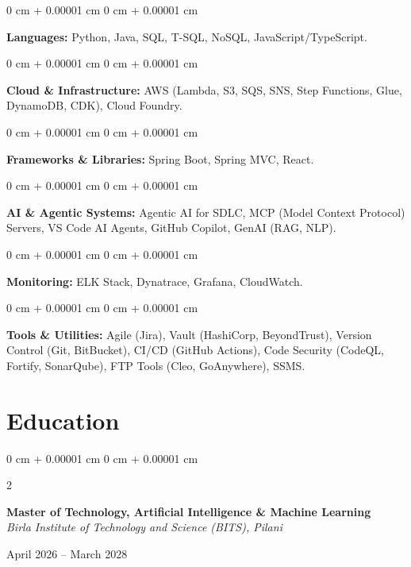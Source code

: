\documentclass[10pt, letterpaper]{article}
\newenvironment{onecolentry}{
    \begin{adjustwidth}{
        0 cm + 0.00001 cm
    }{
        0 cm + 0.00001 cm
    }
}{
    \end{adjustwidth}
} %
\newenvironment{twocolentry}[2][]{
    \onecolentry
    \def\secondColumn{#2}
    \setcolumnwidth{\fill, 4.5 cm}
    \begin{paracol}{2}
}{
    \switchcolumn \raggedleft \secondColumn
    \end{paracol}
    \endonecolentry
} %
\begin{document}
        \begin{onecolentry}
            \textbf{Languages:} Python, Java, SQL, T-SQL, NoSQL, JavaScript/TypeScript.
        \end{onecolentry}
        \vspace{0.2 cm}

        \begin{onecolentry}
            \textbf{Cloud \& Infrastructure:} AWS (Lambda, S3, SQS, SNS, Step Functions, Glue, DynamoDB, CDK), Cloud Foundry.
        \end{onecolentry}
        \vspace{0.2 cm}

        \begin{onecolentry}
            \textbf{Frameworks \& Libraries:} Spring Boot, Spring MVC, React.
        \end{onecolentry}
        \vspace{0.2 cm}

        \begin{onecolentry}
            \textbf{AI \& Agentic Systems:} Agentic AI for SDLC, MCP (Model Context Protocol) Servers, VS Code AI Agents, GitHub Copilot, GenAI (RAG, NLP).
        \end{onecolentry}
        \vspace{0.2 cm}

        \begin{onecolentry}
            \textbf{Monitoring:} ELK Stack, Dynatrace, Grafana, CloudWatch.
        \end{onecolentry}
        \vspace{0.2 cm}

        \begin{onecolentry}
            \textbf{Tools \& Utilities:} Agile (Jira), Vault (HashiCorp, BeyondTrust), Version Control (Git, BitBucket), CI/CD (GitHub Actions), Code Security (CodeQL, Fortify, SonarQube), FTP Tools (Cleo, GoAnywhere), SSMS.
        \end{onecolentry}
        \vspace{0.2 cm}

          \section{Education}



        
       \begin{twocolentry}{April 2026 – March 2028}
            \textbf{Master of Technology, Artificial Intelligence \& Machine Learning} \\
            \textit{Birla Institute of Technology and Science (BITS), Pilani}
        \end{twocolentry}
\end{document}
